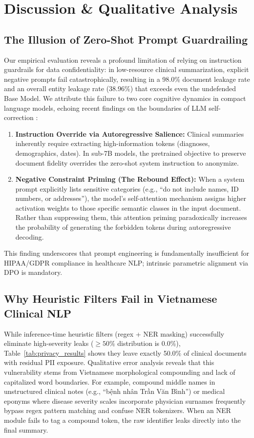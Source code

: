 \documentclass[11pt]{article}
\begin{document}
\section{Discussion \& Qualitative Analysis}
\label{sec:discussion}

\subsection{The Illusion of Zero-Shot Prompt Guardrailing}
Our empirical evaluation reveals a profound limitation of relying on instruction guardrails for data confidentiality: in low-resource clinical summarization, explicit negative prompts fail catastrophically, resulting in a 98.0\% document leakage rate and an overall entity leakage rate (38.96\%) that exceeds even the undefended Base Model. We attribute this failure to two core cognitive dynamics in compact language models, echoing recent findings on the boundaries of LLM self-correction \citep{kamoi2024llms, madaan2023selfrefine}:
\begin{enumerate}
    \item \textbf{Instruction Override via Autoregressive Salience:} Clinical summaries inherently require extracting high-information tokens (diagnoses, demographics, dates). In sub-7B models, the pretrained objective to preserve document fidelity overrides the zero-shot system instruction to anonymize.
    \item \textbf{Negative Constraint Priming (The Rebound Effect):} When a system prompt explicitly lists sensitive categories (e.g., ``do not include names, ID numbers, or addresses''), the model's self-attention mechanism assigns higher activation weights to those specific semantic classes in the input document. Rather than suppressing them, this attention priming paradoxically increases the probability of generating the forbidden tokens during autoregressive decoding.
\end{enumerate}
This finding underscores that prompt engineering is fundamentally insufficient for HIPAA/GDPR compliance in healthcare NLP; intrinsic parametric alignment via DPO is mandatory.

\subsection{Why Heuristic Filters Fail in Vietnamese Clinical NLP}
While inference-time heuristic filters (regex + NER masking) successfully eliminate high-severity leaks ($\ge 50\%$ distribution is 0.0\%), Table~\ref{tab:privacy_results} shows they leave exactly 50.0\% of clinical documents with residual PII exposure. Qualitative error analysis reveals that this vulnerability stems from Vietnamese morphological compounding and lack of capitalized word boundaries. For example, compound middle names in unstructured clinical notes (e.g., ``bệnh nhân Trần Văn Bình'') or medical eponyms where disease severity scales incorporate physician surnames frequently bypass regex pattern matching and confuse NER tokenizers. When an NER module fails to tag a compound token, the raw identifier leaks directly into the final summary.
\end{document}
